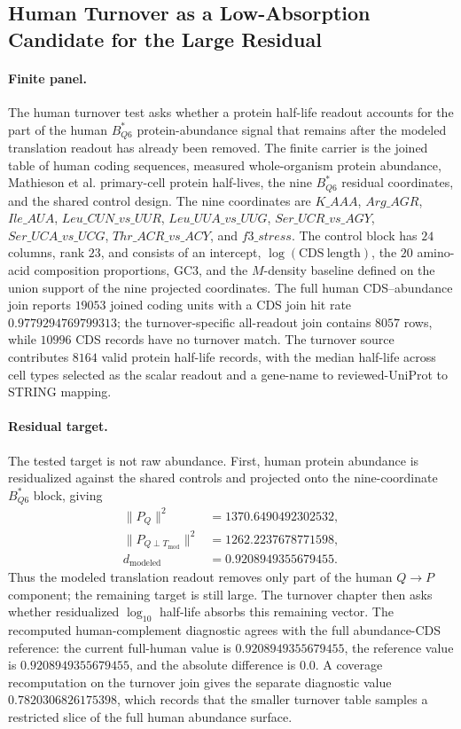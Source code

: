 \subsection{Human Turnover as a Low-Absorption Candidate for the Large Residual}
\label{sec:bioreality-human-turnover-large-residual}

\paragraph{Finite panel.}
The human turnover test asks whether a protein half-life readout accounts for the part of the human $B^{\ast}_{Q6}$ protein-abundance signal that remains after the modeled translation readout has already been removed.  The finite carrier is the joined table of human coding sequences, measured whole-organism protein abundance, Mathieson et al. primary-cell protein half-lives, the nine $B^{\ast}_{Q6}$ residual coordinates, and the shared control design.  The nine coordinates are $K\_AAA$, $Arg\_AGR$, $Ile\_AUA$, $Leu\_CUN\_vs\_UUR$, $Leu\_UUA\_vs\_UUG$, $Ser\_UCR\_vs\_AGY$, $Ser\_UCA\_vs\_UCG$, $Thr\_ACR\_vs\_ACY$, and $f3\_stress$.  The control block has $24$ columns, rank $23$, and consists of an intercept, $\log(\mathrm{CDS\ length})$, the $20$ amino-acid composition proportions, GC3, and the $M$-density baseline defined on the union support of the nine projected coordinates.  The full human CDS--abundance join reports $19053$ joined coding units with a CDS join hit rate $0.9779294769799313$; the turnover-specific all-readout join contains $8057$ rows, while $10996$ CDS records have no turnover match.  The turnover source contributes $8164$ valid protein half-life records, with the median half-life across cell types selected as the scalar readout and a gene-name to reviewed-UniProt to STRING mapping.

\paragraph{Residual target.}
The tested target is not raw abundance.  First, human protein abundance is residualized against the shared controls and projected onto the nine-coordinate $B^{\ast}_{Q6}$ block, giving
$$
\begin{aligned}
\|P_Q\|^2 &= 1370.6490492302532,\\
\|P_{Q\perp T_{\mathrm{mod}}}\|^2 &= 1262.2237678771598,\\
d_{\mathrm{modeled}} &= 0.9208949355679455.
\end{aligned}
$$
Thus the modeled translation readout removes only part of the human $Q\to P$ component; the remaining target is still large.  The turnover chapter then asks whether residualized $\log_{10}$ half-life absorbs this remaining vector.  The recomputed human-complement diagnostic agrees with the full abundance-CDS reference: the current full-human value is $0.9208949355679455$, the reference value is $0.9208949355679455$, and the absolute difference is $0.0$.  A coverage recomputation on the turnover join gives the separate diagnostic value $0.7820306826175398$, which records that the smaller turnover table samples a restricted slice of the full human abundance surface.

